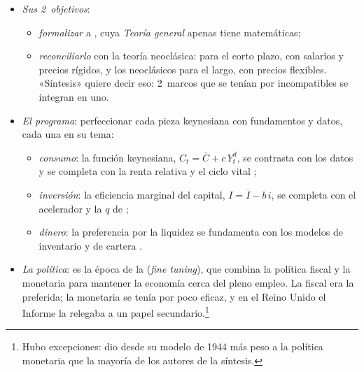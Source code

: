\documentclass[11pt]{article}
\begin{document}
\begin{itemize}
\begin{itemize}
    \begin{itemize}
    \item \emph{objeto}: la renta y el empleo a corto plazo y la política de estabilización. Una economía de mercado sujeta a perturbaciones de demanda, sobre todo de la inversión, que la política puede y debe estabilizar;
    \item \emph{método}: modelos de equilibrio con pocas ecuaciones, estimados con la nueva \emph{econometría}.  construyó en 1936 el primer modelo macroeconométrico de un país, los Países Bajos, y después contrastó las teorías del ciclo\nocite{Tinbergen1939Statistical}; el modelo de \textcite{KleinGoldberger1955Econometric} hizo lo mismo para Estados Unidos. Las expectativas son \emph{estáticas} o exógenas: no reaccionan a la política.
    \end{itemize}
  \end{itemize}
\item \emph{Sus 2~objetivos}:
  \begin{itemize}
  \item \emph{formalizar} a , cuya \emph{Teoría general} apenas tiene matemáticas;
  \item \emph{reconciliarlo} con la teoría neoclásica:  para el corto plazo, con salarios y precios rígidos, y los neoclásicos para el largo, con precios flexibles. «Síntesis» quiere decir eso: 2~marcos que se tenían por incompatibles se integran en uno\nocite{DeVroeyDuarte2013Search}.
  \end{itemize}
\item \emph{El programa}: perfeccionar cada pieza keynesiana con fundamentos y datos, cada una en su tema:
  \begin{itemize}
  \item \emph{consumo}: la función keynesiana, $C_t=\overline{C}+c\,Y^d_t$, se contrasta con los datos y se completa con la renta relativa y el ciclo vital ;
  \item \emph{inversión}: la eficiencia marginal del capital, $I=\overline{I}-b\,i$, se completa con el acelerador y la $q$ de  ;
  \item \emph{dinero}: la preferencia por la liquidez se fundamenta con los modelos de inventario y de cartera .
  \end{itemize}
\item \emph{La política}: es la época de la  (\emph{fine tuning}), que combina la política fiscal y la monetaria para mantener la economía cerca del pleno empleo. La fiscal era la preferida; la monetaria se tenía por poco eficaz, y en el Reino Unido el Informe  la relegaba a un papel secundario\nocite{Radcliffe1959Report}.\footnote{Hubo excepciones:  dio desde su modelo de 1944 más peso a la política monetaria que la mayoría de los autores de la síntesis.}
\end{itemize}
\end{document}
